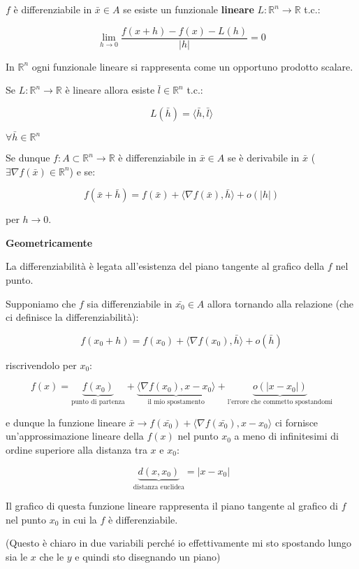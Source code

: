 \documentclass[../appunti-analisi.tex]{subfiles}
\begin{document}
$f$ è differenziabile in $\bar{x} \in A$ se esiste un funzionale \textbf{lineare} $L: \mathbb{R}^{n} \rightarrow \mathbb{R}$ t.c.:

\[
    \lim_{ h \to 0 } \frac{f(x+h) -f(x) - L(h)}{|h|} = 0
\]

In $\mathbb{R}^{n}$ ogni funzionale lineare si rappresenta come un opportuno prodotto scalare.


Se $L: \mathbb{R}^{n}\rightarrow \mathbb{R}$ è lineare allora esiste $\bar{l} \in \mathbb{R}^{n}$ t.c.:

\[
    L(\bar{h} ) = \langle \bar{h} , \bar{l}  \rangle
\]

$\forall \bar{h} \in \mathbb{R}^{n}$

Se dunque $f: A \subset \mathbb{R}^{n}\rightarrow \mathbb{R}$ è differenziabile in $\bar{x} \in A$ se è derivabile in $\bar{x} $ ($\exists \nabla f(\bar{x} ) \in \mathbb{R}^{n}$) e se:

\[
    f(\bar{x} + \bar{h} ) = f(\bar{x} ) + \langle \nabla f(\bar{x} ), \bar{h}  \rangle + o(|h|)
\]

per $h \rightarrow 0$.


\textbf{Geometricamente} 

La differenziabilità è legata all'esistenza del piano tangente al grafico della $f$ nel punto.

Supponiamo che $f$ sia differenziabile in $\bar{x_0} \in A $ allora tornando alla relazione (che ci definisce la differenziabilità):

\[
    f(x_0+h) = f(x_0) +\langle \nabla f(x_0) , \bar{h} \rangle  + o(\bar{h} )
\]

riscrivendolo per $x_0$:

\[
    f(x) = \underbrace{f(x_0)}_\text{punto di partenza} + \underbrace{\langle \nabla f(x_0), x-x_0 \rangle}_\text{il mio spostamento} + \underbrace{o(|x-x_0|)}_\text{l'errore che commetto spostandomi}
\]

e dunque la funzione lineare $\bar{x} \rightarrow  f(\bar{x_0} ) + \langle \nabla f(\bar{x_0} ), x-x_0 \rangle$ ci fornisce un'approssimazione lineare della $f(x)$ nel punto $x_0$ a meno di infinitesimi di ordine superiore alla distanza tra $x$ e $x_0$:

\[
    \underbrace{d(x,x_0)}_\text{distanza euclidea} = |x- x_0|
\]

Il grafico di questa funzione lineare rappresenta il piano tangente al grafico di $f$ nel punto $x_0$ in cui la $f$ è differenziabile. 

(Questo è chiaro in due variabili perché io effettivamente mi sto spostando lungo sia le $x$ che le $y$ e quindi sto disegnando un piano)
\end{document}
